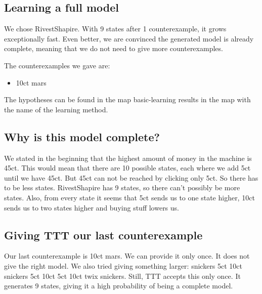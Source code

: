 \documentclass[11pt,a4paper]{article}
\begin{document}
\subsection{Learning a full model}
We chose RivestShapire. With 9 states after 1 counterexample, it grows exceptionally fast. Even better, we are convinced the generated model is already complete, meaning that we do not need to give more counterexamples.

The counterexamples we gave are:
\begin{itemize}
	\item 10ct mars
\end{itemize}

The hypotheses can be found in the map basic-learning results in the map with the name of the learning method.

\subsection{Why is this model complete?}
We stated in the beginning that the highest amount of money in the machine is 45ct. This would mean that there are 10 possible states, each where we add 5ct until we have 45ct. But 45ct can not be reached by clicking only 5ct. So there has to be less states. RivestShapire has 9 states, so there can't possibly be more states. Also, from every state it seems that 5ct sends us to one state higher, 10ct sends us to two states higher and buying stuff lowers us.




\subsection{Giving TTT our last counterexample}
Our last counterexample is 10ct mars. We can provide it only once. It does not give the right model.
We also tried giving something larger: snickers 5ct 10ct snickers 5ct 10ct 5ct 10ct twix snickers.
Still, TTT accepts this only once. It generates 9 states, giving it a high probability of being a complete model.
\end{document}
